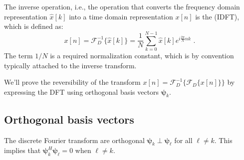 The inverse operation, i.e., the operation that converts the frequency
domain representation $\hat{x}[k]$ into a time domain representation
$x[n]$ is the  (IDFT), which is
defined as:
\begin{equation}
\boxed{
x[n] = \mathcal{F}_D^{-1}\{\hat{x}[k]\} = \frac{1}{N}\sum_{k=0}^{N-1} \hat{x}[k] e^{i\frac{2\pi}{N} nk}
} \,\,.
\end{equation}
The term $1/N$ is a required normalization constant, which is by
convention typically attached to the inverse transform.

We'll prove the reversibility of the transform
$x[n]=\mathcal{F}_D^{-1}\{\mathcal{F}_D\{x[n]\}\}$ by expressing the DFT
using orthogonal basis vectors $\bm{\psi}_k$.

\subsection{Orthogonal basis vectors}

\usetikzlibrary{calc,angles,quotes}
\usetikzlibrary{quotes,angles}
\begin{marginfigure}
\begin{center}
\end{center}
\caption{The discrete Fourier transform  are orthogonal $\bm{\psi}_{k} \perp \bm{\psi}_{\ell}$ for all $\ell \ne k$. This implies that $\bm{\psi}_k^{H}\bm{\psi}_{\ell} = 0$ when $\ell \ne k$.}
\end{marginfigure}

